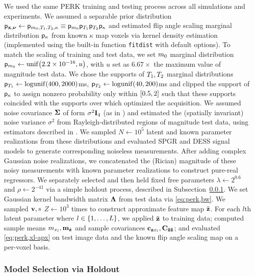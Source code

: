 We used the same PERK training and testing process
across all simulations and experiments.
We assumed a separable prior distribution
$\mathsf{p}_{\mathbf{x},\boldsymbol{\nu}} \gets \mathsf{p}_{m_0,T_1,T_2,\kappa} 
	\equiv \mathsf{p}_{m_0}\mathsf{p}_{T_1}\mathsf{p}_{T_2}\mathsf{p}_{\kappa}$
and estimated flip angle scaling marginal distribution $\mathsf{p}_{\kappa}$
from known $\kappa$ map voxels
via kernel density estimation 
(implemented using 
the built-in \matlab function \texttt{fitdist}
with default options).
To match the scaling of training and test data,
we set $m_0$ marginal distribution 
$\dist{\mzero} \gets \unif{2.2\times10^{-16},u}$,
with $u$ set as $6.67\times$ the maximum value
of magnitude test data.
We chose the supports 
of $T_1,T_2$ marginal distributions 
$\dist{\To} \gets \logunif{400,2000}$ms,
$\dist{\Tt} \gets \logunif{40,200}$ms
and clipped the support 
of $\mathsf{p}_{\kappa}$
to assign nonzero probability
only within $\brac{0.5,2}$
such that these supports 
coincided with the supports 
over which \cite{nataraj:17:oms} 
optimized the acquisition.
We assumed noise covariance $\boldsymbol{\Sigma}$ 
of form $\sigma^2 \mathbf{I}_{4}$ 
(as in \cite{nataraj:17:oms})
and estimated the 
(spatially invariant) noise variance $\sigma^2$
from Rayleigh-distributed regions 
of magnitude test data,
using estimators described in \cite{siddiqui:64:sif}.
We sampled $N \gets 10^5$ 
latent and known parameter realizations
from these distributions
and evaluated SPGR and DESS signal models
to generate corresponding noiseless measurements.
After adding complex Gaussian noise realizations,
we concatenated the (Rician) magnitude 
of these noisy measurements
with known parameter realizations
to construct pure-real regressors. 
We separately selected and then held fixed 
free parameters $\lambda \gets 2^{0.6}$ 
and $\rho \gets 2^{-41}$
via a simple holdout process,
described in Subsection~\ref{sss,perk,exp,meth,holdout}.
We set Gaussian kernel bandwidth matrix $\boldsymbol{\Lambda}$ 
from test data via \eqref{eq:perk,bw}.
We sampled $\mathbf{v},s$ $Z \gets 10^3$ times 
to construct approximate feature map $\tilde{\mathbf{z}}$. 
For each $l$th latent parameter
where $l \in \set{1,\dots,L}$,
we applied $\tilde{\mathbf{z}}$ to training data;
computed sample means $m_{x_l}, \mathbf{m}_{\tilde{\mathbf{z}}}$ 
and sample covariances $\mathbf{c}_{\mathbf{z} x_l}, \mathbf{C_{\tilde{\mathbf{z}}\tilde{\mathbf{z}}}}$;
and evaluated \eqref{eq:perk,xl-apx}
on test image data 
and the known flip angle scaling map
on a per-voxel basis. 

\subsubsection{Model Selection via Holdout}
\label{sss,perk,exp,meth,holdout}

